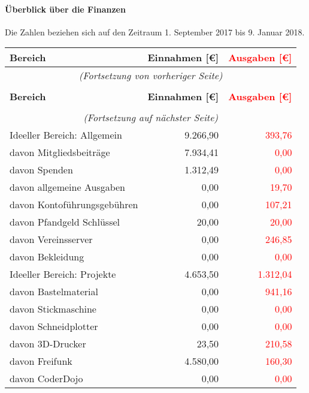 \documentclass{s0minutes}
\begin{document}
\paragraph{Überblick über die Finanzen}
Die Zahlen beziehen sich auf den Zeitraum 1. September 2017 bis 9. Januar 2018.

\begin{longtable}{lr>{\textcolor{red}\bgroup}r<{\egroup}}
  \textbf{Bereich} & \textbf{Einnahmen [€]} & \textbf{Ausgaben [€]} \\
  \midrule
  \endfirsthead
  \multicolumn{3}{c}{\emph{(Fortsetzung von vorheriger Seite)}} \\
  \\
  \textbf{Bereich} & \textbf{Einnahmen [€]} & \textbf{Ausgaben [€]} \\
  \midrule
  \endhead
  \\
  \multicolumn{3}{c}{\emph{(Fortsetzung auf nächster Seite)}} \\
  \endfoot
  \endlastfoot
  Ideeller Bereich: Allgemein       &  9{.}266{,}90 &       393{,}76 \\
  \quad davon Mitgliedsbeiträge     &  7{.}934{,}41 &         0{,}00 \\
  \quad davon Spenden               &  1{.}312{,}49 &         0{,}00 \\
  \quad davon allgemeine Ausgaben   &        0{,}00 &        19{,}70 \\
  \quad davon Kontoführungsgebühren &        0{,}00 &       107{,}21 \\
  \quad davon Pfandgeld Schlüssel   &       20{,}00 &        20{,}00 \\
  \quad davon Vereinsserver         &        0{,}00 &       246{,}85 \\
  \quad davon Bekleidung            &        0{,}00 &         0{,}00 \\
  \midrule
  Ideeller Bereich: Projekte        &  4{.}653{,}50 &   1{.}312{,}04 \\
  \quad davon Bastelmaterial        &        0{,}00 &       941{,}16 \\
  \quad davon Stickmaschine         &        0{,}00 &         0{,}00 \\
  \quad davon Schneidplotter        &        0{,}00 &         0{,}00 \\
  \quad davon 3D-Drucker            &       23{,}50 &       210{,}58 \\
  \quad davon Freifunk              &  4{.}580{,}00 &       160{,}30 \\
  \quad davon CoderDojo             &        0{,}00 &         0{,}00 \\

\end{longtable}
\end{document}
